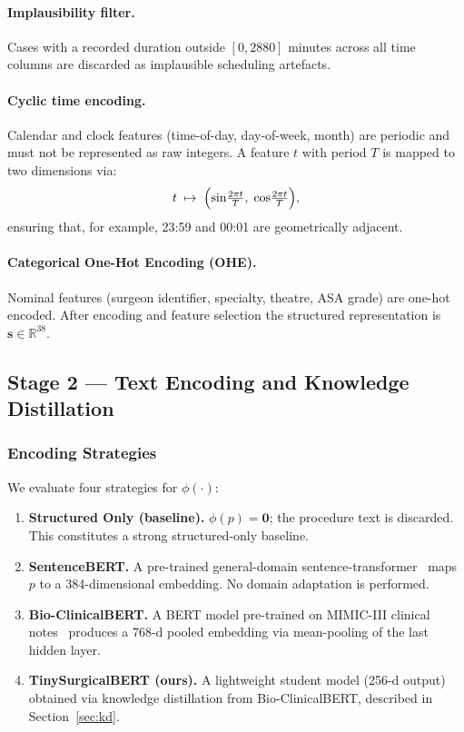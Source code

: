 \documentclass[3p]{elsarticle}
\begin{document}
\paragraph{Implausibility filter.}
Cases with a recorded duration outside $[0, 2880]$ minutes across all time columns are discarded as implausible scheduling artefacts.

\paragraph{Cyclic time encoding.}
Calendar and clock features (time-of-day, day-of-week, month) are periodic and must not be represented as raw integers. A feature $t$ with period $T$ is mapped to two dimensions via:
\begin{equation}
  t \;\mapsto\; \Bigl(\sin\!\tfrac{2\pi t}{T},\;\cos\!\tfrac{2\pi t}{T}\Bigr),
  \label{eq:cyclic}
\end{equation}
ensuring that, for example, 23:59 and 00:01 are geometrically adjacent.

\paragraph{Categorical One-Hot Encoding (OHE).}
Nominal features (surgeon identifier, specialty, theatre, ASA grade) are one-hot encoded. After encoding and feature selection the structured representation is $\mathbf{s} \in \mathbb{R}^{38}$.

\subsection{Stage 2 — Text Encoding and Knowledge Distillation}
\label{sec:stage2}

\subsubsection{Encoding Strategies}

We evaluate four strategies for $\phi(\cdot)$:

\begin{enumerate}
  \item \textbf{Structured Only (baseline).}  $\phi(p) = \mathbf{0}$; the procedure text is discarded. This constitutes a strong structured-only baseline.
  \item \textbf{SentenceBERT.}  A pre-trained general-domain sentence-transformer~\cite{reimers2019sentencebert} maps $p$ to a 384-dimensional embedding. No domain adaptation is performed.
  \item \textbf{Bio-ClinicalBERT.}  A BERT model pre-trained on MIMIC-III clinical notes~\cite{alsentzer2019bioclinicalbert} produces a 768-d pooled embedding via mean-pooling of the last hidden layer.
  \item \textbf{TinySurgicalBERT (ours).}  A lightweight student model (256-d output) obtained via knowledge distillation from Bio-ClinicalBERT, described in Section~\ref{sec:kd}.
\end{enumerate}
\end{document}
